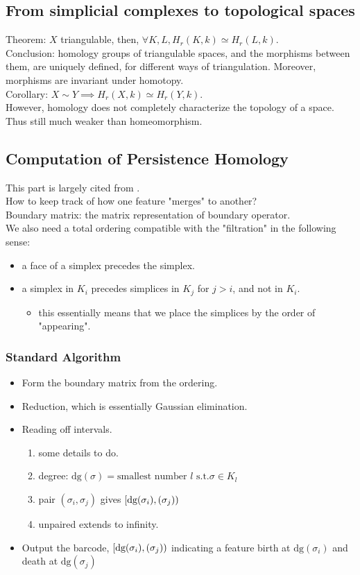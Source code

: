 \documentclass[10pt,a4paper]{article}
\begin{document}
\subsection{From simplicial complexes to topological spaces}
Theorem: $X$ triangulable, then, $\forall K,L,H_r(K,k)\simeq H_r(L,k)$.\\
Conclusion: homology groups of triangulable spaces, and the morphisms between them, are uniquely defined, for different ways of triangulation. Moreover, morphisms are invariant under homotopy.\\
Corollary: $X\sim Y\implies H_r(X,k)\simeq H_r(Y,k)$.\\
However, homology does not completely characterize the topology of a space. Thus still much weaker than homeomorphism.
\subsection{Computation of Persistence Homology}
This part is largely cited from \cite{Otter2017}.\\
How to keep track of how one feature "merges" to another?\\
Boundary matrix: the matrix representation of boundary operator.\\
We also need a total ordering compatible with the "filtration" in the following sense:
\begin{itemize}
	\item a face of a simplex precedes the simplex.
	\item a simplex in $K_i$ precedes simplices in $K_j$ for $j>i$, and not in $K_i$.
	\begin{itemize}
		\item this essentially means that we place the simplices by the order of "appearing".
	\end{itemize}
\end{itemize}

\subsubsection{Standard Algorithm}
\begin{itemize}
	\item Form the boundary matrix from the ordering.
	\item Reduction, which is essentially Gaussian elimination.
	\item Reading off intervals.
	\begin{enumerate}
		\item some details to do.
		\item degree: $\text{dg}(\sigma)=\text{smallest number }l\text{ s.t.}\sigma\in K_l$
		\item pair $(\sigma_i,\sigma_j)$ gives $[\text{dg}(\sigma_i),\text(\sigma_j))$
		\item unpaired extends to infinity.
	\end{enumerate}
	\item Output the barcode, $[\text{dg}(\sigma_i),\text(\sigma_j))$ indicating a feature birth at $\text{dg}(\sigma_i)$ and death at $\text{dg}(\sigma_j)$
\end{itemize}
\end{document}
